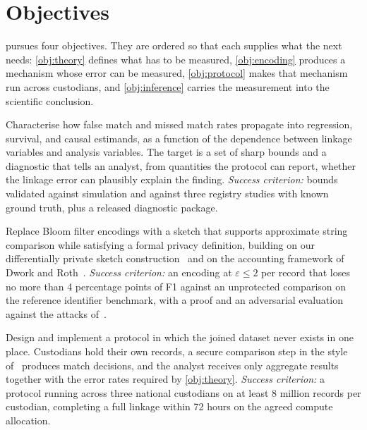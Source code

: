 \section{Objectives}
\label{sec:objectives}

\proj{} pursues four objectives. They are ordered so that each supplies what the next needs:
\ref{obj:theory} defines what has to be measured, \ref{obj:encoding} produces a mechanism whose
error can be measured, \ref{obj:protocol} makes that mechanism run across custodians, and
\ref{obj:inference} carries the measurement into the scientific conclusion.

Characterise how false match and missed match rates propagate into regression, survival, and causal
estimands, as a function of the dependence between linkage variables and analysis variables. The
target is a set of sharp bounds and a diagnostic that tells an analyst, from quantities the protocol
can report, whether the linkage error can plausibly explain the finding.
\emph{Success criterion:} bounds validated against simulation and against three registry studies
with known ground truth, plus a released diagnostic package.

Replace Bloom filter encodings with a sketch that supports approximate string comparison while
satisfying a formal privacy definition, building on our differentially private sketch
construction~\cite{okparalange2024sketch} and on the accounting framework of Dwork and
Roth~\cite{dwork2014dpfoundations}.
\emph{Success criterion:} an encoding at $\varepsilon \le 2$ per record that loses no more than
4 percentage points of F1 against an unprotected comparison on the reference identifier benchmark,
with a proof and an adversarial evaluation against the attacks
of~\cite{christen2018attack,haugsdal2022graphattack}.

Design and implement a protocol in which the joined dataset never exists in one place. Custodians
hold their own records, a secure comparison step in the style of~\cite{yao1982protocols} produces
match decisions, and the analyst receives only aggregate results together with the error rates
required by \ref{obj:theory}.
\emph{Success criterion:} a protocol running across three national custodians on at least
8 million records per custodian, completing a full linkage within 72 hours on the agreed compute
allocation.

